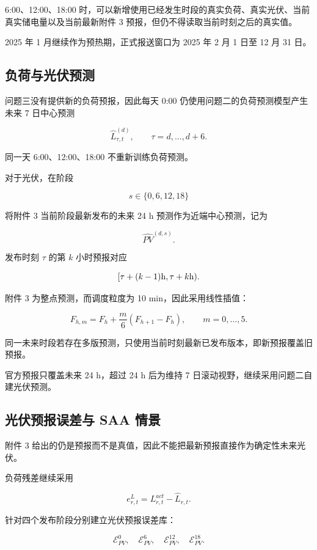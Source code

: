 6:00、12:00、18:00 时，可以新增使用已经发生时段的真实负荷、真实光伏、当前真实储电量以及当前最新附件 3 预报，但仍不得读取当前时刻之后的真实值。

2025 年 1 月继续作为预热期，正式报送窗口为 2025 年 2 月 1 日至 12 月 31 日。

\subsection{负荷与光伏预测}

问题三没有提供新的负荷预报，因此每天 0:00 仍使用问题二的负荷预测模型产生未来 7 日中心预测

\[
\hat L_{\tau,t}^{(d)},
\qquad
\tau=d,\ldots,d+6.
\]

同一天 6:00、12:00、18:00 不重新训练负荷预测。

对于光伏，在阶段

\[
s\in\{0,6,12,18\}
\]

将附件 3 当前阶段最新发布的未来 24 h 预测作为近端中心预测，记为

\[
\widehat{PV}^{(d,s)}.
\]

发布时刻 \(\tau\) 的第 \(k\) 小时预报对应

\[
[\tau+(k-1){\rm h},\tau+k{\rm h}).
\]

附件 3 为整点预测，而调度粒度为 10 min，因此采用线性插值：

\begin{equation}
F_{h,m}
=
F_h+\frac{m}{6}(F_{h+1}-F_h),
\qquad
m=0,\ldots,5.
\end{equation}

同一未来时段若存在多版预测，只使用当前时刻最新已发布版本，即新预报覆盖旧预报。

官方预报只覆盖未来 24 h，超过 24 h 后为维持 7 日滚动视野，继续采用问题二自建光伏预测。

\subsection{光伏预报误差与 SAA 情景}

附件 3 给出的仍是预报而不是真值，因此不能把最新预报直接作为确定性未来光伏。

负荷残差继续采用

\[
e^L_{r,t}
=
L^{act}_{r,t}
-
\hat L_{r,t}.
\]

针对四个发布阶段分别建立光伏预报误差库：

\[
\mathcal E_{PV}^{0},
\quad
\mathcal E_{PV}^{6},
\quad
\mathcal E_{PV}^{12},
\quad
\mathcal E_{PV}^{18}.
\]


